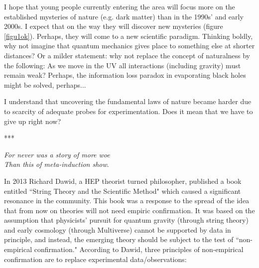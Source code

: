 \documentclass[epsfig,12pt]{article}
\begin{document}
I hope that young people currently entering the area will focus more 
on the established mysteries of nature (e.g. dark matter) than in the 1990s' and early 2000s. I expect that on the way they will discover  new mysteries
(figure \ref{figu1ok}). Perhaps, they will 
come to a new scientific paradigm. Thinking boldly, why not imagine that quantum mechanics  gives place to something else at shorter distances? 
 Or a milder statement: why not replace the concept of naturalness by the following: As we move in the UV all interactions (including gravity) must remain weak? Perhaps, the information loss paradox in evaporating black holes might be solved, perhaps...
 
 I understand that uncovering  the fundamental laws of nature became harder due to scarcity of adequate  probes for experimentation.
 Does it mean that we have to give up right now? 

 


\vspace{2mm}

\centerline{***}



\begin{flushright}
 \begin{minipage}[h]{20em}
{\em 
For never was a story of more woe \\
Than this of meta-induction show}. \cite{DS}
\end{minipage}
\end{flushright}

\vspace{1mm}

In 2013 Richard Dawid, a HEP theorist turned philosopher, published a book entitled ``String Theory and the Scientific Method" \cite{RD} which caused a significant resonance in the 
community.  This book was a response to the spread of the idea that from now on theories will not need empiric confirmation. It was based on the assumption that physicists' pursuit for quantum gravity
(through string theory) and early cosmology (through Multiverse) cannot be supported by data in principle, and instead, the emerging theory should be subject to the test of ``non-empirical confirmation."
According to Dawid, three principles of non-empirical confirmation are to replace experimental data/observations:
\end{document}
